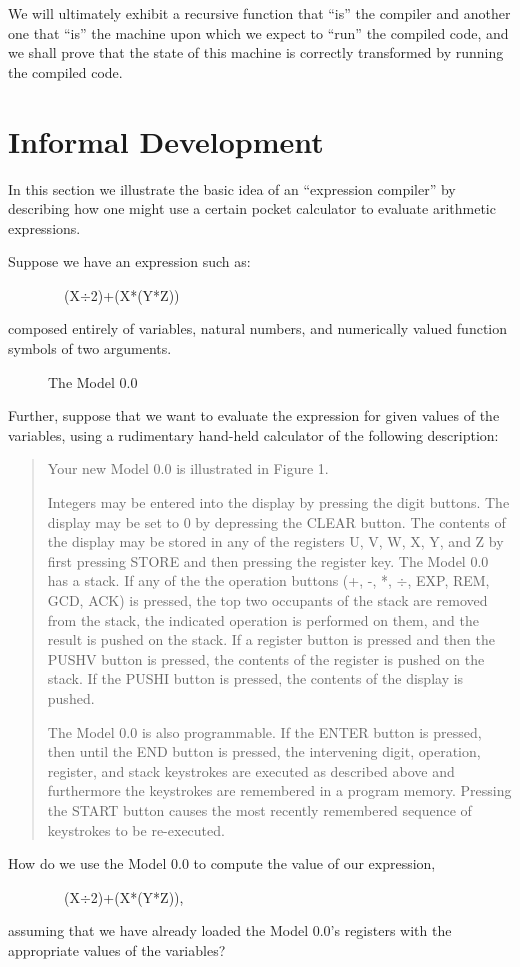 \documentclass[10pt]{book}
\newenvironment{pubasis}{\begin{flushleft}}{\end{flushleft}}
\newenvironment{pubcrown}{\begin{quote}}{\end{quote}}
\begin{document}
We will ultimately exhibit a recursive function
that ``is'' the compiler and another one that ``is'' the machine upon which we
expect to ``run'' the compiled code, and we shall prove that the state of
this machine is correctly transformed by running the compiled code.

\section{Informal Development}
In this section we illustrate the basic idea of an ``expression
compiler'' by describing how one might use a certain
pocket calculator to evaluate arithmetic expressions.

Suppose we have an expression such as:

\begin{pubasis}
~~~~~~~~(X$\div$2)+(X*(Y*Z))\\
\end{pubasis}
composed entirely of variables, natural numbers, and numerically valued
function symbols of two arguments.

\begin{figure}
\vspace{50\baselineskip}
\caption{The Model 0.0}
\end{figure}
Further, suppose that we want to evaluate the expression for given values of
the variables, using a rudimentary hand-held calculator of the
following description:
\begin{pubcrown}
Your new Model 0.0 is illustrated in Figure 1.

Integers may be entered into the display
by pressing the digit buttons.  The display may be set to 0 by
depressing the CLEAR button.  The contents of the display may
be stored in any of the registers U, V, W, X, Y, and Z
by first pressing STORE and then pressing the register key.
The Model 0.0 has a stack.  If any of the the operation
buttons (+, -, *, $\div$, EXP, REM, GCD, ACK) is pressed,
the top two occupants of the stack are removed from the stack,
the indicated operation is performed on them, and the result
is pushed on the stack.  If a register button is pressed and
then the PUSHV button is pressed, the contents of the
register is pushed on the stack.  If the PUSHI button is
pressed, the contents of the display is pushed.

The Model 0.0 is also programmable.  If the ENTER button is pressed,
then until the END button is pressed, the intervening
digit, operation, register, and stack keystrokes
are executed as described above and furthermore
the keystrokes are remembered in a program memory.
Pressing the START button causes the most recently
remembered sequence of keystrokes to be 
re-executed.
\end{pubcrown}
How do we use the Model 0.0 to compute the value of our expression,
\begin{pubasis}
~~~~~~~~(X$\div$2)+(X*(Y*Z)),\\
\end{pubasis}
assuming that we have already loaded the Model 0.0's registers
with the appropriate values of the variables?
\end{document}
